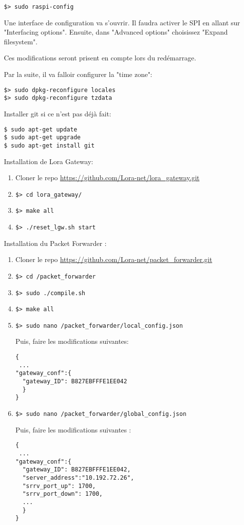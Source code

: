 \texttt{\$> sudo raspi-config}

Une interface de configuration va s'ouvrir. Il faudra activer le SPI en allant sur "Interfacing options". Ensuite, dans "Advanced options" choisissez "Expand filesystem".

Ces modifications seront prisent en compte lors du redémarrage.

Par la suite, il va falloir configurer la "time zone":

\begin{verbatim}
$> sudo dpkg-reconfigure locales
$> sudo dpkg-reconfigure tzdata
\end{verbatim}

Installer git si ce n'est pas déjà fait:
\begin{verbatim}
$ sudo apt-get update
$ sudo apt-get upgrade
$ sudo apt-get install git
\end{verbatim}

Installation de Lora Gateway:
\begin{enumerate}
\item Cloner le repo \url{https://github.com/Lora-net/lora_gateway.git}
\item \texttt{\$> cd lora\_gateway/}
\item \texttt{\$> make all}
\item \texttt{\$> ./reset\_lgw.sh start}
\end{enumerate}

\clearpage
Installation du Packet Forwarder : 

\begin{enumerate}
\item Cloner le repo \url{https://github.com/Lora-net/packet_forwarder.git}
\item \texttt{\$> cd /packet\_forwarder}
\item \texttt{\$> sudo ./compile.sh}
\item \texttt{\$> make all}
\item \texttt{\$> sudo nano /packet\_forwarder/local\_config.json}

Puis, faire les modifications suivantes:
\medskip

\begin{lstlisting}[style=Java]
{
 ...
"gateway_conf":{
  "gateway_ID": B827EBFFFE1EE042
  }
}
\end{lstlisting}
\medskip

\item \texttt{\$> sudo nano /packet\_forwarder/global\_config.json}

Puis, faire les modifications suivantes : 

\medskip
\begin{lstlisting}[style=Java]
{
 ...
"gateway_conf":{
  "gateway_ID": B827EBFFFE1EE042,
  "server_address":"10.192.72.26",
  "srrv_port_up": 1700,
  "srrv_port_down": 1700,
  ...
  }
}
\end{lstlisting}
\end{enumerate}

